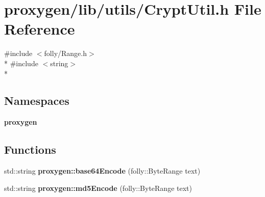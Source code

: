 \section{proxygen/lib/utils/\+Crypt\+Util.h File Reference}
\label{CryptUtil_8h}
{\ttfamily \#include $<$folly/\+Range.\+h$>$}\\*
{\ttfamily \#include $<$string$>$}\\*
\subsection*{Namespaces}
\begin{DoxyCompactItemize}
\item 
 {\bf proxygen}
\end{DoxyCompactItemize}
\subsection*{Functions}
\begin{DoxyCompactItemize}
\item 
std\+::string {\bf proxygen\+::base64\+Encode} (folly\+::\+Byte\+Range text)
\item 
std\+::string {\bf proxygen\+::md5\+Encode} (folly\+::\+Byte\+Range text)
\end{DoxyCompactItemize}

